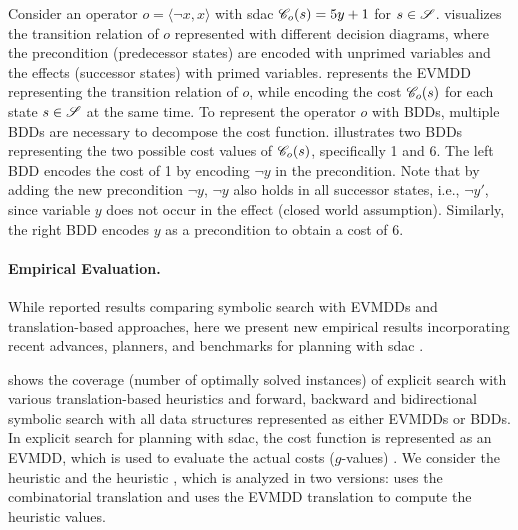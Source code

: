 \begin{example}
    Consider an operator $o = \langle \lnot x, x \rangle$ with sdac $\mathscr C_o(s) = 5y +1$ for $s \in \mathscr S$.  visualizes the transition relation of $o$ represented with different decision diagrams, where the precondition (predecessor states) are encoded with unprimed variables and the effects (successor states) with primed variables.  represents the EVMDD representing the transition relation of $o$, while encoding the cost $\mathscr C_o(s)$ for each state $s \in \mathscr S$ at the same time. To represent the operator $o$ with BDDs, multiple BDDs are necessary to decompose the cost function.
     illustrates two BDDs representing the two possible cost values of $\mathscr C_o(s)$, specifically 1 and 6. The left BDD encodes the cost of 1 by encoding $ \lnot y$ in the precondition.  Note that by adding the new precondition $\lnot y$, $\lnot y$ also holds in all successor states, i.e., $\lnot y'$, since variable $y$ does not occur in the effect (closed world assumption). Similarly, the right BDD encodes $y$ as a precondition to obtain a cost of 6.
\end{example}

\paragraph{Empirical Evaluation.}  While \textcite{speck-et-al-icaps2018}  reported results comparing symbolic search with EVMDDs and translation-based approaches, here we present new empirical results incorporating recent advances, planners, and benchmarks for planning with sdac \autocite{geisser-phd2018,corraya-et-al-ki2019,speck-et-al-icaps2021}.

 shows the coverage (number of optimally solved instances) of explicit \astar{} search \autocite{hart-et-al-ieeessc1968} with various translation-based heuristics \autocite{geisser-phd2018} and forward, backward and bidirectional symbolic search with all data structures represented as either EVMDDs \autocite{speck-et-al-icaps2018} or BDDs.
In explicit \astar{} search for planning with sdac, the cost function is represented as an EVMDD, which is used to evaluate the actual costs ($g$-values) \autocite{geisser-phd2018}.
We consider the  heuristic and the  heuristic \autocite{bonet-geffner-ecp1999}, which is analyzed in two versions:  uses the combinatorial translation \autocite{geisser-phd2018} and  uses the EVMDD translation \autocite{geisser-et-al-ijcai2015} to compute the heuristic values.

